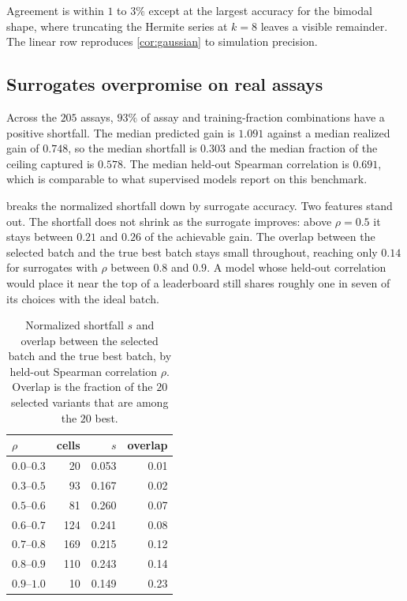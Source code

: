\documentclass{article}
\theoremstyle{plain}
\theoremstyle{definition}
\begin{document}
Agreement is within $1$ to $3\%$ except at the largest accuracy for the bimodal shape,
where truncating the Hermite series at $k=8$ leaves a visible remainder. The linear row
reproduces \cref{cor:gaussian} to simulation precision.

\subsection{Surrogates overpromise on real assays}
\label{sec:results-gap}

Across the $205$ assays, $93\%$ of assay and training-fraction combinations have a
positive shortfall. The median predicted gain is $1.091$ against a median realized gain
of $0.748$, so the median shortfall is $0.303$ and the median fraction of the ceiling
captured is $0.578$. The median held-out Spearman correlation is $0.691$, which is
comparable to what supervised models report on this benchmark.

 breaks the normalized shortfall down by surrogate accuracy. Two
features stand out. The shortfall does not shrink as the surrogate improves: above
$\rho = 0.5$ it stays between $0.21$ and $0.26$ of the achievable gain. The overlap
between the selected batch and the true best batch stays small throughout, reaching
only $0.14$ for surrogates with $\rho$ between $0.8$ and $0.9$. A model whose held-out
correlation would place it near the top of a leaderboard still shares roughly one in
seven of its choices with the ideal batch.

\begin{table}[t]
\caption{Normalized shortfall $s$ and overlap between the selected batch and the true
best batch, by held-out Spearman correlation $\rho$. Overlap is the fraction of the
$20$ selected variants that are among the $20$ best.}
\label{tab:byrho}
\vskip 0.1in
\begin{center}
\begin{small}
\begin{tabular}{lrrr}
\toprule
$\rho$ & cells & $s$ & overlap \\
\midrule
$0.0$--$0.3$ & 20  & 0.053 & 0.01 \\
$0.3$--$0.5$ & 93  & 0.167 & 0.02 \\
$0.5$--$0.6$ & 81  & 0.260 & 0.07 \\
$0.6$--$0.7$ & 124 & 0.241 & 0.08 \\
$0.7$--$0.8$ & 169 & 0.215 & 0.12 \\
$0.8$--$0.9$ & 110 & 0.243 & 0.14 \\
$0.9$--$1.0$ & 10  & 0.149 & 0.23 \\
\bottomrule
\end{tabular}
\end{small}
\end{center}
\vskip -0.1in
\end{table}
\end{document}
